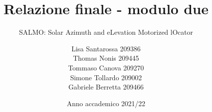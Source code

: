 \documentclass{layout/tudelft-report}
\begin{document}
\frontmatter

\title{Relazione finale - modulo due}

\subtitle{\qquad \qquad SALMO: \newline Solar Azimuth and eLevation Motorized lOcator}
\author{Lisa Santarossa 209386\\
        Thomas Nonis 209445\\
        Tommaso Canova 209270\\
        Simone Tollardo 209002\\
        Gabriele Berretta 209466
        }
        
\subject{Corso di Progettazione e Prototipazione di Sistemi Elettronici}
\date{Anno accademico 2021/22}


\makecover



\setcounter{tocdepth}{1}
\tableofcontents

\mainmatter














\end{document}
